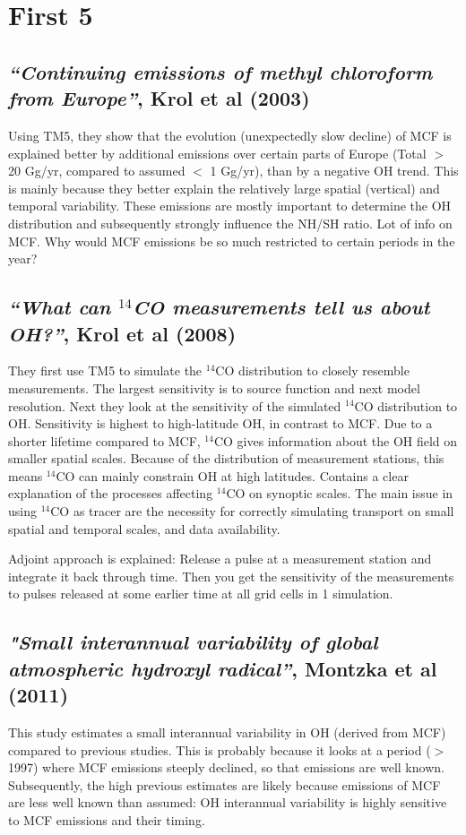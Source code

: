\documentclass{article}
\begin{document}
\tableofcontents

\section{First 5}

\subsection{\textit{“Continuing emissions of methyl chloroform from Europe”}, Krol et al (2003)}
Using TM5, they show that the evolution (unexpectedly slow decline) of MCF is explained better by additional emissions over certain parts of Europe (Total $>$ 20 Gg/yr, compared to assumed $<$ 1 Gg/yr), than by a negative OH trend. This is mainly because they better explain the relatively large spatial (vertical) and temporal variability. These emissions are mostly important to determine the OH distribution and subsequently strongly influence the NH/SH ratio. Lot of info on MCF.
Why would MCF emissions be so much restricted to certain periods in the year? 

\subsection{\textit{“What can $^{14}$CO measurements tell us about OH?”}, Krol et al (2008)}
They first use TM5 to simulate the $^{14}$CO distribution to closely resemble measurements. The largest sensitivity is to source function and next model resolution.
Next they look at the sensitivity of the simulated $^{14}$CO distribution to OH. Sensitivity is highest to high-latitude OH, in contrast to MCF. Due to a shorter lifetime compared to MCF, $^{14}$CO gives information about the OH field on smaller spatial scales. Because of the distribution of measurement stations, this means $^{14}$CO can mainly constrain OH at high latitudes. Contains a clear explanation of the processes affecting $^{14}$CO on synoptic scales. The main issue in using $^{14}$CO as tracer are the necessity for correctly simulating transport on small spatial and temporal scales, and data availability.

Adjoint approach is explained: Release a pulse at a measurement station and integrate it back through time. Then you get the sensitivity of the measurements to pulses released at some earlier time at all grid cells in 1 simulation.

\subsection{\textit{"Small interannual variability of global atmospheric hydroxyl radical”}, Montzka et al (2011)}
This study estimates a small interannual variability in OH (derived from MCF) compared to previous studies. This is probably because it looks at a period ($>$ 1997) where MCF emissions steeply declined, so that emissions are well known. Subsequently, the high previous estimates are likely because emissions of MCF are less well known than assumed: OH interannual variability is highly sensitive to MCF emissions and their timing.
\end{document}
